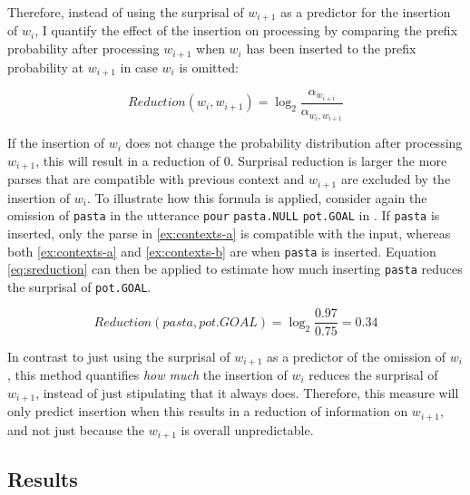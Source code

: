 Therefore, instead of using the surprisal of $w_{i+1}$ as a predictor for the insertion of $w_i$, I quantify the effect of the insertion on processing by comparing the prefix probability after processing $w_{i+1}$ when $w_i$ has been inserted to the prefix probability at $w_{i+1}$ in case $w_i$ is omitted:

\begin{equation} 
 \displaystyle Reduction(w_i, w_{i+1}) = \log_2 \frac{\alpha_{w_{i+i}}}{\alpha_{w_i, w_{i+1}}} \label{eq:sreduction}
\end{equation}

If the insertion of $w_i$ does not change the probability distribution after processing $w_{i+1}$, this will result in a reduction of 0. Surprisal reduction is larger the more parses that are compatible with previous context and $w_{i+1}$ are excluded by the insertion of $w_i$. To illustrate how this formula is applied, consider again the omission of \texttt{pasta} in the utterance \texttt{pour} \texttt{pasta.NULL} \texttt{pot.GOAL} in \LLast. If \texttt{pasta} is inserted, only the parse in \ref{ex:contexts-a} is compatible with the input, whereas both \ref{ex:contexts-a} and \ref{ex:contexts-b} are when \texttt{pasta} is inserted. Equation \ref{eq:sreduction} can then be applied to estimate how much inserting \texttt{pasta} reduces the surprisal of \texttt{pot.GOAL}.

\begin{equation} 
 \displaystyle Reduction(pasta, pot.GOAL) = \log_2 \frac{0.97}{0.75} = 0.34
\end{equation}

In contrast to just using the surprisal of $w_{i+1}$ as a predictor of the omission of $w_i$, this method quantifies \textit{how much} the insertion of $w_i$ reduces the surprisal of $w_{i+1}$,  instead of just stipulating that it always does. Therefore, this measure will only predict insertion when this results in a reduction of information on $w_{i+1}$, and not just because the $w_{i+1}$ is overall unpredictable. 

\subsection{Results}
\label{sec:scripts-production-results}

